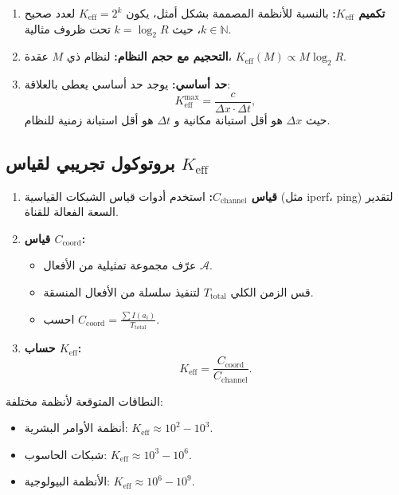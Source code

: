 \documentclass[11pt,a4paper]{article}
\begin{document}
	\begin{enumerate}
		\item \textbf{تكميم $K_{\mathrm{eff}}$:} بالنسبة للأنظمة المصممة بشكل أمثل، يكون $K_{\mathrm{eff}} = 2^k$ لعدد صحيح $k \in \mathbb{N}$، حيث $k = \log_2 R$ تحت ظروف مثالية.
		
		\item \textbf{التحجيم مع حجم النظام:} لنظام ذي $M$ عقدة، $K_{\mathrm{eff}}(M) \propto M \log_2 R$.
		
		\item \textbf{حد أساسي:} يوجد حد أساسي يعطى بالعلاقة:
		\[
		K_{\mathrm{eff}}^{\text{max}} = \frac{c}{\Delta x \cdot \Delta t},
		\]
		حيث $\Delta x$ هو أقل استبانة مكانية و $\Delta t$ هو أقل استبانة زمنية للنظام.
	\end{enumerate}
	
	\subsection{بروتوكول تجريبي لقياس $K_{\mathrm{eff}}$}
	\label{app:experiment}
	
	\begin{enumerate}
		\item \textbf{قياس $C_{\text{channel}}$:} استخدم أدوات قياس الشبكات القياسية (مثل iperf، ping) لتقدير السعة الفعالة للقناة.
		
		\item \textbf{قياس $C_{\text{coord}}$:}
		\begin{itemize}
			\item عرّف مجموعة تمثيلية من الأفعال $\mathcal{A}$.
			\item قس الزمن الكلي $T_{\text{total}}$ لتنفيذ سلسلة من الأفعال المنسقة.
			\item احسب $C_{\text{coord}} = \frac{\sum I(a_i)}{T_{\text{total}}}$.
		\end{itemize}
		
		\item \textbf{حساب $K_{\mathrm{eff}}$:}
		\[
		K_{\mathrm{eff}} = \frac{C_{\text{coord}}}{C_{\text{channel}}}.
		\]
	\end{enumerate}
	
	النطاقات المتوقعة لأنظمة مختلفة:
	\begin{itemize}
		\item أنظمة الأوامر البشرية: $K_{\mathrm{eff}} \approx 10^2 - 10^3$.
		\item شبكات الحاسوب: $K_{\mathrm{eff}} \approx 10^3 - 10^6$.
		\item الأنظمة البيولوجية: $K_{\mathrm{eff}} \approx 10^6 - 10^9$.
	\end{itemize}
	
\end{document}
